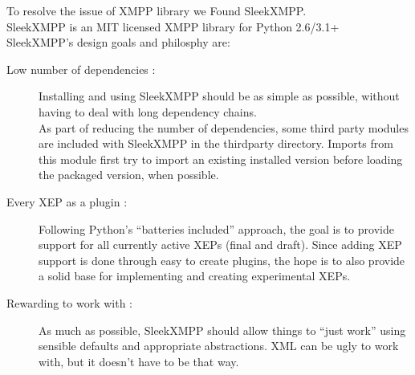 To resolve the issue of XMPP library we Found SleekXMPP.\\[0.5cm]
SleekXMPP is an MIT licensed XMPP library for Python 2.6/3.1+\\[0.5cm]
SleekXMPP’s design goals and philosphy are:
\begin{description}
\item[ Low number of dependencies :] Installing and using SleekXMPP should be as simple as possible, without having to deal with long dependency chains.\\As part of reducing the number of dependencies, some third party modules are included with SleekXMPP in the thirdparty directory. Imports from this module first try to import an existing installed version before loading the packaged version, when possible.
\item[Every XEP as a plugin :] Following Python’s “batteries included” approach, the goal is to provide support for all currently active XEPs (final and draft). Since adding XEP support is done through easy to create plugins, the hope is to also provide a solid base for implementing and creating experimental XEPs.
\item[Rewarding to work with :] As much as possible, SleekXMPP should allow things to “just work” using sensible defaults and appropriate abstractions. XML can be ugly to work with, but it doesn’t have to be that way. 
\end{description}

    

    

    